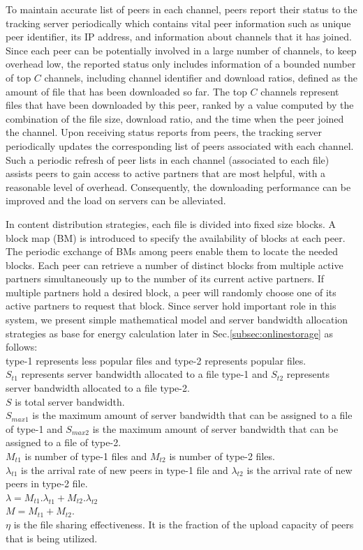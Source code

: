 \documentclass[conference]{IEEEtran}
\begin{document}
To maintain accurate list of peers in each channel, peers report their status to the tracking server periodically which contains vital peer information such as unique peer identifier, its IP address, and information about channels that it has joined. 
Since each peer can be potentially involved in a large number of channels, to keep overhead low, the reported status only includes information of a bounded number of top $C$ channels, including channel identifier and download ratios, defined as the amount of file that has been downloaded so far. 
The top $C$ channels represent files that have been downloaded by this peer, ranked by a value computed by the combination of the file size, download ratio, and the time when the peer joined the channel. 
Upon receiving status reports from peers, the tracking server periodically updates the corresponding list of peers associated with each channel.
Such a periodic refresh of peer lists in each channel (associated to each file) assists peers to gain access to active partners that are most helpful, with a reasonable level of overhead. 
Consequently, the downloading performance can be improved and the load on servers can be alleviated. 

In content distribution strategies, each file is divided into fixed size blocks.
A block map (BM) is introduced to specify the availability of blocks at each peer. 
The periodic exchange of BMs among peers enable them to locate the needed blocks. 
Each peer can retrieve a number of distinct blocks from multiple active partners simultaneously up to the number of its current active partners.
If multiple partners hold a desired block, a peer will randomly choose one of its active partners to request that block.
Since server hold important role in this system, we present simple mathematical model and server bandwidth allocation strategies \cite{4024139,Sun:2009:POS:1542245.1542249} as base for energy calculation later in Sec.\ref{subsec:onlinestorage} as follows:\\
type-1 represents less popular files and type-2 represents popular files. \\
$S_{t1}$ represents server bandwidth allocated to a file type-1 and $S_{t2}$ represents server bandwidth allocated to a file type-2. \\
$S$ is total server bandwidth. \\
$S_{max1}$ is the maximum amount of server bandwidth that can be assigned to a file of type-1 and $S_{max2}$ is the maximum amount of server bandwidth that can be assigned to a file of type-2.\\
$M_{t1}$ is number of type-1 files and  $M_{t2}$ is number of type-2 files.\\
$\lambda_{t1}$ is the arrival rate of new peers in type-1 file and $\lambda_{t2}$ is the arrival rate of new peers in type-2 file.\\
$\lambda = M_{t1}.\lambda_{t1} + M_{t2}.\lambda_{t2}$\\
$M=M_{t1} + M_{t2}$.\\
$\eta$ is the file sharing effectiveness. It is the fraction of the upload capacity of peers that is being utilized.\\
\end{document}
